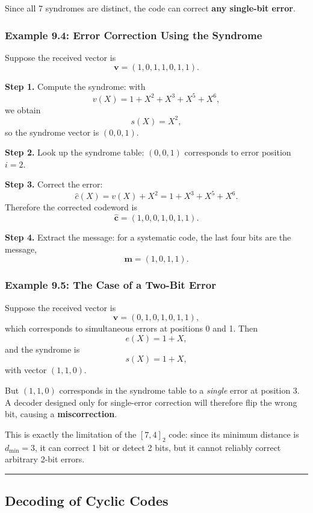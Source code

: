 \documentclass[
]{article}
\begin{document}
Since all 7 syndromes are distinct, the code can correct \textbf{any
single-bit error}.

\subsubsection{Example 9.4: Error Correction Using the
Syndrome}\label{example-9.4-error-correction-using-the-syndrome}

Suppose the received vector is \[\mathbf{v}=(1,0,1,1,0,1,1).\]

\textbf{Step 1.} Compute the syndrome: with \[v(X)=1+X^2+X^3+X^5+X^6,\]
we obtain \[s(X)=X^2,\] so the syndrome vector is \((0,0,1)\).

\textbf{Step 2.} Look up the syndrome table: \((0,0,1)\) corresponds to
error position \(i=2\).

\textbf{Step 3.} Correct the error:
\[\hat{c}(X)=v(X)+X^2 = 1+X^3+X^5+X^6.\] Therefore the corrected
codeword is \[\hat{\mathbf{c}}=(1,0,0,1,0,1,1).\]

\textbf{Step 4.} Extract the message: for a systematic code, the last
four bits are the message, \[\mathbf{m}=(1,0,1,1).\]

\subsubsection{Example 9.5: The Case of a Two-Bit
Error}\label{example-9.5-the-case-of-a-two-bit-error}

Suppose the received vector is \[\mathbf{v}=(0,1,0,1,0,1,1),\] which
corresponds to simultaneous errors at positions 0 and 1. Then
\[e(X)=1+X,\] and the syndrome is \[s(X)=1+X,\] with vector \((1,1,0)\).

But \((1,1,0)\) corresponds in the syndrome table to a \emph{single}
error at position 3. A decoder designed only for single-error correction
will therefore flip the wrong bit, causing a \textbf{miscorrection}.

This is exactly the limitation of the \([7,4]_2\) code: since its
minimum distance is \(d_{\min}=3\), it can correct 1 bit or detect 2
bits, but it cannot reliably correct arbitrary 2-bit errors.

\begin{center}\rule{0.5\linewidth}{0.5pt}\end{center}

\subsection{Decoding of Cyclic Codes}\label{what-is-the-decoding-process-for-a-cyclic-code}
\end{document}
